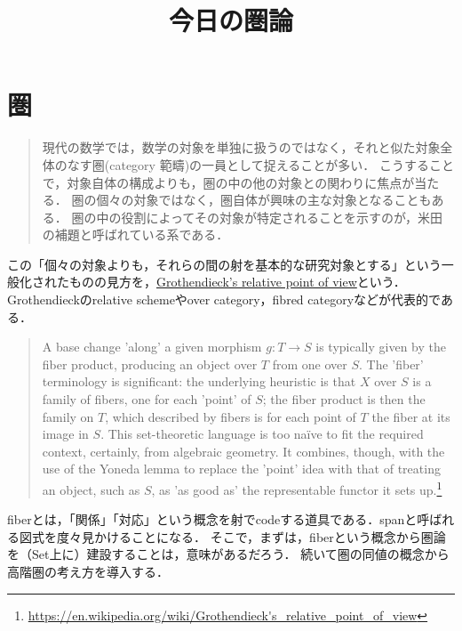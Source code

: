 \documentclass[uplatex,dvipdfmx]{jsreport}
\title{今日の圏論}
\author{}
\begin{document}
\tableofcontents

\chapter{圏}

\begin{tcolorbox}[colframe=ForestGreen, colback=ForestGreen!10!white, breakable ,colbacktitle=ForestGreen!40!white, coltitle=black,fonttitle=\bfseries\sffamily,
    title=Grothendieck's relative point of view]
    \begin{quote}
        現代の数学では，数学の対象を単独に扱うのではなく，それと似た対象全体のなす圏(category 範疇)の一員として捉えることが多い．
        こうすることで，対象自体の構成よりも，圏の中の他の対象との関わりに焦点が当たる．
        圏の個々の対象ではなく，圏自体が興味の主な対象となることもある．
        圏の中の役割によってその対象が特定されることを示すのが，米田の補題と呼ばれている系である．\cite{数学原論}
    \end{quote}
    この「個々の対象よりも，それらの間の射を基本的な研究対象とする」という一般化されたものの見方を，\href{https://en.wikipedia.org/wiki/Grothendieck's_relative_point_of_view}{Grothendieck's relative point of view}という．Grothendieckのrelative schemeやover category，fibred categoryなどが代表的である．
    \begin{quote}
        A base change 'along' a given morphism
        $g:T\to S$
        is typically given by the fiber product, producing an object over $T$ from one over $S$.
        The 'fiber' terminology is significant: the underlying heuristic is that $X$ over $S$ is a family of fibers, one for each 'point' of $S$; the fiber product is then the family on $T$, which described by fibers is for each point of $T$ the fiber at its image in $S$.
        This set-theoretic language is too naïve to fit the required context, certainly, from algebraic geometry. It combines, though, with the use of the Yoneda lemma to replace the 'point' idea with that of treating an object, such as $S$, as 'as good as' the representable functor it sets up.\footnote{\url{https://en.wikipedia.org/wiki/Grothendieck's_relative_point_of_view}}
    \end{quote}
    fiberとは，「関係」「対応」という概念を射でcodeする道具である．spanと呼ばれる図式を度々見かけることになる．
    そこで，まずは，fiberという概念から圏論を（Set上に）建設することは，意味があるだろう．
    続いて圏の同値の概念から高階圏の考え方を導入する．
\end{tcolorbox}
\end{document}
